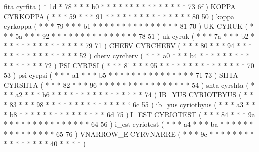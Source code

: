 \makecod fita         cyrfita           ( *  1d      *  78  *  *  *  b0    *  *  *  *  *     *  *  *  *     *  *  *     *   *  *    73 6f  )
\makeCOD KOPPA        CYRKOPPA          ( *  *       *  59  *  *  *  91    *  *  *  *  *     *  *  *  *     *  *  *     *   *  *    80 50  )
\makecod koppa        cyrkoppa          ( *  *       *  79  *  *  *  b1    *  *  *  *  *     *  *  *  *     *  *  *     *   *  *    81 70  )
\makeCOD UK           CYRUK             ( *  *       *  5a  *  *  *  92    *  *  *  *  *     *  *  *  *     *  *  *     *   *  *    78 51  )
\makecod uk           cyruk             ( *  *       *  7a  *  *  *  b2    *  *  *  *  *     *  *  *  *     *  *  *     *   *  *    79 71  )
\makeCOD CHERV        CYRCHERV          ( *  *       *  80  *  *  *  94    *  *  *  *  *     *  *  *  *     *  *  *     *   *  *    *  52  )
\makecod cherv        cyrcherv          ( *  *       *  a0  *  *  *  b4    *  *  *  *  *     *  *  *  *     *  *  *     *   *  *    *  72  )
\makeCOD PSI          CYRPSI            ( *  *       *  81  *  *  *  95    *  *  *  *  *     *  *  *  *     *  *  *     *   *  *    70 53  )
\makecod psi          cyrpsi            ( *  *       *  a1  *  *  *  b5    *  *  *  *  *     *  *  *  *     *  *  *     *   *  *    71 73  )
\makeCOD SHTA         CYRSHTA           ( *  *       *  82  *  *  *  96    *  *  *  *  *     *  *  *  *     *  *  *     *   *  *    *  54  )
\makecod shta         cyrshta           ( *  *       *  a2  *  *  *  b6    *  *  *  *  *     *  *  *  *     *  *  *     *   *  *    *  74  )
\makeCOD IB_YUS       CYRIOTBYUS        ( *  *       *  83  *  *  *  98    *  *  *  *  *     *  *  *  *     *  *  *     *   *  *    6c 55  )
\makecod ib_yus       cyriotbyus        ( *  *       *  a3  *  *  *  b8    *  *  *  *  *     *  *  *  *     *  *  *     *   *  *    6d 75  )
\makeCOD I_EST        CYRIOTEST         ( *  *       *  84  *  *  *  9a    *  *  *  *  *     *  *  *  *     *  *  *     *   *  *    64 56  )
\makecod i_est        cyriotest         ( *  *       *  a4  *  *  *  ba    *  *  *  *  *     *  *  *  *     *  *  *     *   *  *    65 76  )
%
\makeCOD VNARROW_E    CYRVNARRE         ( *  *       *  9c  *  *  *  *     *  *  *  *  *     *  *  *  *     *  *  *     40  *  *    *  *   )
